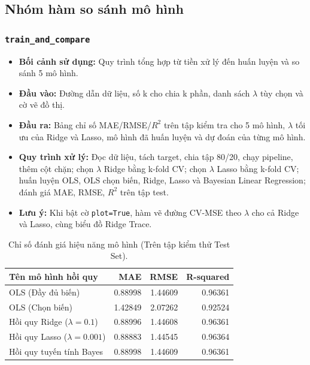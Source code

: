 \documentclass[a4paper]{article}
\newcommand{\code}[1]{\colorbox{light-gray}{\texttt{#1}}}
\begin{document}
\subsection{Nhóm hàm so sánh mô hình}

\subsubsection{\code{train\_and\_compare}}
\begin{itemize}[leftmargin=*]
    \item \textbf{Bối cảnh sử dụng:} Quy trình tổng hợp từ tiền xử lý đến huấn luyện và so sánh 5 mô hình.
    \item \textbf{Đầu vào:} Đường dẫn dữ liệu, số k cho chia k phần, danh sách $\lambda$ tùy chọn và cờ vẽ đồ thị.
    \item \textbf{Đầu ra:} Bảng chỉ số MAE/RMSE/$R^2$ trên tập kiểm tra cho 5 mô hình, $\lambda$ tối ưu của Ridge và Lasso, mô hình đã huấn luyện và dự đoán của từng mô hình.
    \item \textbf{Quy trình xử lý:} Đọc dữ liệu, tách target, chia tập 80/20, chạy pipeline, thêm cột chặn; chọn $\lambda$ Ridge bằng k-fold CV; chọn $\lambda$ Lasso bằng k-fold CV; huấn luyện OLS, OLS chọn biến, Ridge, Lasso và Bayesian Linear Regression; đánh giá MAE, RMSE, $R^2$ trên tập test.
    \item \textbf{Lưu ý:} Khi bật cờ \texttt{plot=True}, hàm vẽ đường CV-MSE theo $\lambda$ cho cả Ridge và Lasso, cùng biểu đồ Ridge Trace.
\end{itemize}
\begin{table}[H]
    \centering
    \small
    \begin{tabular}{lrrr}
    \toprule
    \textbf{Tên mô hình hồi quy} & \textbf{MAE} & \textbf{RMSE} & \textbf{R-squared} \\
    \midrule
    OLS (Đầy đủ biến) & 0.88998 & 1.44609 & 0.96361 \\
    OLS (Chọn biến) & 1.42849 & 2.07262 & 0.92524 \\
    Hồi quy Ridge ($\lambda=0.1$) & 0.88996 & 1.44608 & 0.96361 \\
    Hồi quy Lasso ($\lambda=0.001$) & 0.88883 & 1.44545 & 0.96364 \\
    Hồi quy tuyến tính Bayes & 0.88998 & 1.44609 & 0.96361 \\
    \bottomrule
    \end{tabular}
    \caption{Chỉ số đánh giá hiệu năng mô hình (Trên tập kiểm thử Test Set).}
\end{table}
\end{document}

